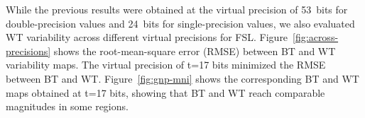 \documentclass[conference]{IEEEtran}
\begin{document}
While the previous results were obtained at the virtual precision of 53~bits for double-precision values
and 24~bits for single-precision values, we also evaluated WT variability across different virtual precisions for FSL.
Figure~\ref{fig:across-precisions} shows the root-mean-square error (RMSE) between BT and WT variability maps.
The virtual precision of t=17 bits minimized the RMSE between BT and WT.
Figure~\ref{fig:gnp-mni} shows the corresponding BT and WT maps obtained at t=17 bits, showing 
that BT and WT reach comparable magnitudes in some regions.

  \begin{figure}[ht]
  \end{figure}
\end{document}
